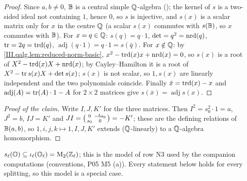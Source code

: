 \begin{lemma}
\end{lemma}
\begin{proof}
Since $a,b\ne0$, $\mathbb{B}$ is a central simple $\mathbb{Q}$-algebra (\cite[§2.1 and Thm.~7.1.1]{Voi}); the kernel of $s$ is a two-sided ideal not containing
$1$, hence $0$, so $s$ is injective, and $s(x)$ is a scalar matrix only for $x$ in the centre $\mathbb{Q}$ (a scalar $s(x)$ commutes with $s(\mathbb{B})$, so $x$
commutes with $\mathbb{B}$). For $x=q\in\mathbb{Q}$: $s(q)=q\cdot1$, $\det=q^2=\operatorname{nrd}(q)$, $\operatorname{tr}=2q=\operatorname{trd}(q)$, $\operatorname{adj}(q\cdot1)=q\cdot1=s(\bar q)$. For
$x\notin\mathbb{Q}$: by \cref{III.qalg.lem:reduced-norm-basic}, $x^2-\operatorname{trd}(x)x+\operatorname{nrd}(x)=0$, so $s(x)$ is a root of $X^2-\operatorname{trd}(x)X+\operatorname{nrd}(x)$; by Cayley--Hamilton
it is a root of $X^2-\operatorname{tr} s(x)X+\det s(x)$; $s(x)$ is not scalar, so $1,s(x)$ are linearly independent and the two polynomials coincide. Finally
$\bar x=\operatorname{trd}(x)-x$ and $\operatorname{adj}(A)=\operatorname{tr}(A)\cdot1-A$ for $2\times2$ matrices give $s(\bar x)=\operatorname{adj}s(x)$.
\end{proof}

\begin{definition}
\end{definition}
\begin{proof}[Proof of the claim]
Write $I,J,K'$ for the three matrices. Then $I^2=s_0^2\cdot1=a$, $J^2=b$, $IJ=K'$ and $JI=\begin{psmallmatrix}0&-bs_0\\s_0&0\end{psmallmatrix}=-K'$;
these are the defining relations of $\mathbb{B}(a,b)$, so $1,i,j,k\mapsto1,I,J,K'$ extends ($\mathbb{Q}$-linearly) to a $\mathbb{Q}$-algebra homomorphism.
\end{proof}

\begin{definition}
\end{definition}
\noindent $s_\ell(\mathbb{O})\subseteq\iota_\ell(\mathbb{O}_\ell)=\mathrm{M}_2(\mathbb{Z}_\ell)$; this is the model of row N3 used by the companion computations
(conventions, P05 M5 (a)). Every statement below holds for every splitting, so this model is a special case.


